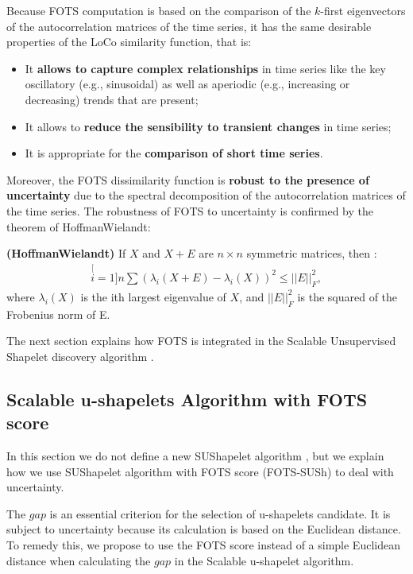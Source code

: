  Because  FOTS computation is based on the comparison of the $k$-first eigenvectors of the autocorrelation
 matrices of the time series, it has the same desirable properties of the LoCo
 similarity function, that is: 
 
 \begin{itemize}
   \item It \textbf{allows to capture complex relationships}
in time series like the key oscillatory (e.g., sinusoidal) as well as aperiodic (e.g.,
increasing or decreasing) trends that are present;
   \item It allows to \textbf{reduce the sensibility to transient changes} in time
   series;
   \item It is appropriate for the \textbf{comparison of short
   time series}.
 \end{itemize}

  Moreover, the FOTS dissimilarity function is \textbf{robust to the presence of
  uncertainty} due to the spectral decomposition of the autocorrelation matrices of the time series. The robustness of FOTS to  uncertainty is confirmed by the  theorem of HoffmanWielandt:   

\begin{theorem}
\textbf{(Hoffman\-Wielandt)} \cite{Bhatia1993} If $X$ and $X + E$ are $n \times
n$ symmetric matrices, then : 
\begin{eqnarray}
\stackrel[i=1]{n}{\sum}(\lambda_{i}(X+E)-\lambda_{i}(X))^{2}\leq||E||_{F}^{2},
\end{eqnarray}
where $\lambda_i(X)$ is the ith largest eigenvalue of $X$, and $||E||_{F}^{2}$
is the squared of the Frobenius norm of E.
\end{theorem}

The next section explains how FOTS is integrated in the Scalable Unsupervised Shapelet discovery algorithm \cite{ulanova2015scalable}.


\subsection{Scalable u-shapelets Algorithm with FOTS score}
In this section we do not define a new SUShapelet algorithm \cite{ulanova2015scalable}, but we explain how we use SUShapelet algorithm with FOTS score (FOTS-SUSh) to deal with uncertainty.



The $gap$ is an essential criterion for the selection of u-shapelets candidate. It is subject to uncertainty because its calculation is based on the
Euclidean distance. To remedy this, we propose to use the FOTS score instead of
a simple Euclidean distance when calculating the $gap$ in the Scalable u-shapelet algorithm.

